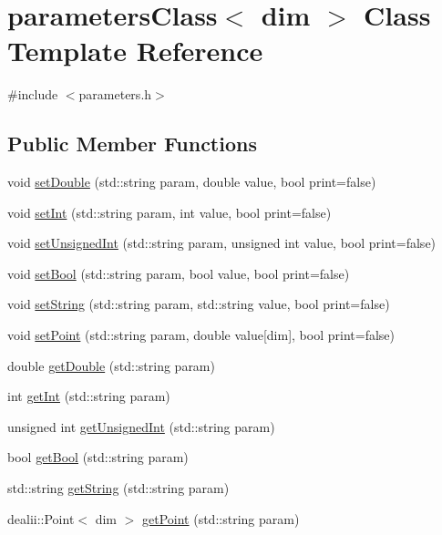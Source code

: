 \section{parameters\-Class$<$ dim $>$ Class Template Reference}
\label{classparameters_class}


{\ttfamily \#include $<$parameters.\-h$>$}

\subsection*{Public Member Functions}
\begin{DoxyCompactItemize}
\item 
void \hyperlink{classparameters_class_ab2755d1057bef657585eb7fdb7d4b5c4}{set\-Double} (std\-::string param, double value, bool print=false)
\item 
void \hyperlink{classparameters_class_a68203d58af0caf8d232ca9a6fcb0a190}{set\-Int} (std\-::string param, int value, bool print=false)
\item 
void \hyperlink{classparameters_class_a8250a061bef7ccda26e06678c8935f43}{set\-Unsigned\-Int} (std\-::string param, unsigned int value, bool print=false)
\item 
void \hyperlink{classparameters_class_a182ca3f26a78847edd31e99fe68059da}{set\-Bool} (std\-::string param, bool value, bool print=false)
\item 
void \hyperlink{classparameters_class_ab06f012067df1884ecc3a71488aa9ca3}{set\-String} (std\-::string param, std\-::string value, bool print=false)
\item 
void \hyperlink{classparameters_class_aeb69e592e5c35d16379edd69a45af4fd}{set\-Point} (std\-::string param, double value\mbox{[}dim\mbox{]}, bool print=false)
\item 
double \hyperlink{classparameters_class_a40b9baa33a85fa60f5df2996d7dec98b}{get\-Double} (std\-::string param)
\item 
int \hyperlink{classparameters_class_aa97dc7db4ec450afd1cb8bd0d8e00d12}{get\-Int} (std\-::string param)
\item 
unsigned int \hyperlink{classparameters_class_ac01aa6fa0c3b6914b0e7b75128c99bc3}{get\-Unsigned\-Int} (std\-::string param)
\item 
bool \hyperlink{classparameters_class_a7c4393bb42319d396ddf38c2464c7062}{get\-Bool} (std\-::string param)
\item 
std\-::string \hyperlink{classparameters_class_a988c0deb4c2cf7e8ed80e39498c1eb58}{get\-String} (std\-::string param)
\item 
dealii\-::\-Point$<$ dim $>$ \hyperlink{classparameters_class_ab98c50b2209c80346a3e6efdd71589b5}{get\-Point} (std\-::string param)
\end{DoxyCompactItemize}
